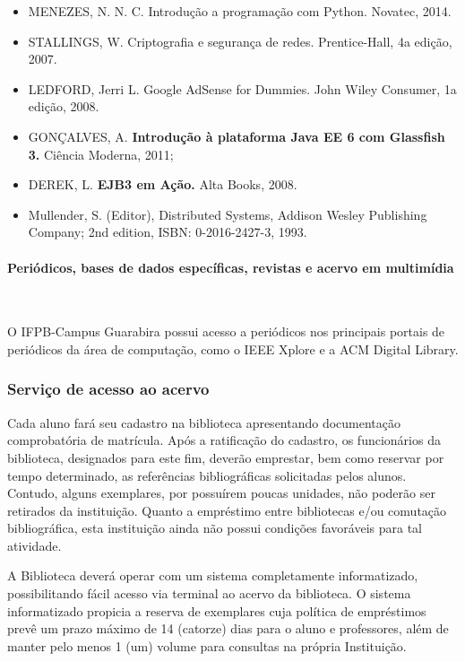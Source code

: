 \begin{itemize}
    \item MENEZES, N. N. C.
          Introdução a programação com Python.
          Novatec, 2014.
    \item STALLINGS, W.
          Criptografia e segurança de redes.
          Prentice-Hall, 4a edição, 2007.

    \item LEDFORD, Jerri L.
          Google AdSense for Dummies.
          John Wiley Consumer, 1a edição, 2008.
	\item 	GONÇALVES, A. \textbf{Introdução à plataforma Java EE 6 com Glassfish 3.} Ciência Moderna, 2011;
	\item 	DEREK, L. \textbf{EJB3 em Ação.} Alta Books, 2008.
	\item Mullender, S. (Editor), Distributed Systems, Addison Wesley Publishing Company; 2nd edition, ISBN: 0-2016-2427-3, 1993.
\end{itemize}

\paragraph{Periódicos, bases de dados específicas, revistas e acervo em multimídia}\

O IFPB-Campus Guarabira possui acesso a periódicos nos principais portais de periódicos da área de computação, como o IEEE Xplore e a ACM Digital Library.

\subsubsection{Serviço de acesso ao acervo}

Cada aluno fará seu cadastro na biblioteca apresentando documentação comprobatória de matrícula. Após a ratificação do cadastro, os funcionários da biblioteca, designados para este fim, deverão emprestar, bem como reservar por tempo determinado, as referências bibliográficas solicitadas pelos alunos. Contudo, alguns exemplares, por possuírem poucas unidades, não poderão ser retirados da instituição. Quanto a empréstimo entre bibliotecas e/ou comutação bibliográfica, esta instituição ainda não possui condições favoráveis para  tal atividade.

A Biblioteca deverá operar com um sistema completamente informatizado, possibilitando fácil acesso via terminal ao acervo da biblioteca. O sistema informatizado propicia a reserva de exemplares cuja política de empréstimos prevê um prazo máximo de 14 (catorze) dias para o aluno e professores, além de manter pelo menos 1 (um) volume para consultas na própria Instituição. 

